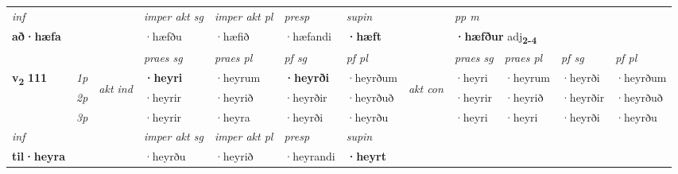 \begin{longtable}[l]{X>{\footnotesize\itshape}llXXXXlXXXX}
   {\textit{inf}} & &  & \textit{imper akt sg} & \textit{imper akt pl}   & \textit{presp} & \textit{supin}  && \textit{pp m} \\*
  {\textbf{að\allowbreak ·hæfa}} & && ·hæfðu  & ·hæfið   & ·hæfandi &  \textbf{·hæft}  && \multicolumn{2}{l}{\textbf{·hæfður} adj\textbf{\textsubscript{2-4}}} \\*

\midrule

 & &   & \textit{praes sg}  & \textit{praes pl}    & \textit{ pf sg} & \textit{pf pl} & & \textit{praes sg}  & \textit{praes pl}    & \textit{pf sg} & \textit{pf pl }  \\ \cmidrule{4-7} \cmidrule{9-12}
 \multirow{2}{*}{{{\textbf{v{\textsubscript{2}}} \Large{\textbf{111}}}}}  & 1p & \multirow{3}{*}{\begin{turn}{90}\textit{akt ind}\end{turn}} & \textbf{·heyri} & ·heyrum & \textbf{·heyrði} & ·heyrðum & \multirow{3}{*}{\begin{turn}{90}\textit{akt con}\end{turn}} &·heyri & ·heyrum & ·heyrði & ·heyrðum\\*
 & 2p &  &  ·heyrir  & ·heyrið & ·heyrðir & ·heyrðuð & & ·heyrir & ·heyrið & ·heyrðir & ·heyrðuð \\*
 & 3p &  & ·heyrir & ·heyra & ·heyrði & ·heyrðu & & ·heyri & ·heyri& ·heyrði & ·heyrðu \\*
\cmidrule{4-7} \cmidrule{9-12}

   {\textit{inf}} & &  & \textit{imper akt sg} & \textit{imper akt pl}   & \textit{presp} & \textit{supin}   \\*
  {\textbf{til\allowbreak ·heyra}} & && ·heyrðu  & ·heyrið   & ·heyrandi &  \textbf{·heyrt}   \\*

\midrule


\end{longtable}
